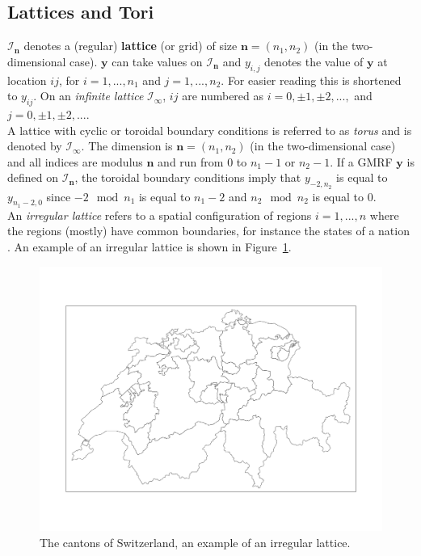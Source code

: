 \subsection{Lattices and Tori}
$\mathcal{I}_{\pmb{n}}$ denotes a (regular) \textbf{lattice} (or grid) of size $\pmb{n}=\left(n_1, n_2\right)$ (in the two-dimensional case). $\pmb{y}$ can take values on $\mathcal{I}_{\pmb{n}}$ and $y_{i,j}$ denotes the value of $\pmb{y}$ at location $ij$, for $i=1,...,n_1$ and $j=1,...,n_2$. For easier reading this is shortened to $y_{ij}$. On an \textit{infinite lattice} $\mathcal{I}_{\pmb{\infty}}$, $ij$ are numbered as $i=0,\pm1,\pm2,...,$ and $j=0,\pm1,\pm2,...$. \\
A lattice with cyclic or toroidal boundary conditions is referred to as \textit{torus} and is denoted by $\mathcal{I}_{\pmb{\infty}}$. The dimension is $\pmb{n}=\left(n_1,n_2\right)$ (in the two-dimensional case) and all indices are modulus $\pmb{n}$ and run from 0 to $n_1-1$ or $n_2-1$. If a GMRF $\pmb{y}$ is defined on $\mathcal{I}_{\pmb{n}}$, the toroidal boundary conditions imply that $y_{-2,n_2}$ is equal to $y_{n_1-2,0}$ since $-2\mod n_1$ is equal to $n_1-2$ and $n_2\mod n_2$ is equal to 0.\\
An \textit{irregular lattice} refers to a spatial configuration of regions $i=1,...,n$ where the regions (mostly) have common boundaries, for instance the states of a nation \autocite[][15--16]{rue2005gaussian}. An example of an irregular lattice is shown in Figure~\ref{fig:lattice}.
\begin{figure}[H]
   \centering
       \includegraphics[page=1,width=\textwidth]{switzerland.pdf}
 \caption{The cantons of Switzerland, an example of an irregular lattice.}
 \label{fig:lattice}
\end{figure}
\clearpage
